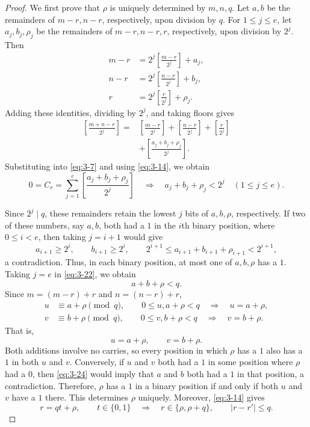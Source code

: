 \documentclass[11pt,a4paper]{article}
\numberwithin{equation}{section}
\theoremstyle{definition}
\begin{document}
\begin{proof}
We first prove that $\rho$ is uniquely determined by $m,n,q$. Let $a,b$ be the remainders of $m-r,n-r$, respectively, upon division by $q$. For $1\le j\le e$, let $a_j,b_j,\rho_j$ be the remainders of $m-r,n-r,r$, respectively, upon division by $2^j$. Then
\[
\begin{aligned}
m-r&=2^j\left[\frac{m-r}{2^j}\right]+a_j,\\
n-r&=2^j\left[\frac{n-r}{2^j}\right]+b_j,\\
r&=2^j\left[\frac r{2^j}\right]+\rho_j.
\end{aligned}
\]
Adding these identities, dividing by $2^j$, and taking floors gives
\[
\begin{aligned}
\left[\frac{m+n-r}{2^j}\right]
={}&\left[\frac{m-r}{2^j}\right]
+\left[\frac{n-r}{2^j}\right]
+\left[\frac r{2^j}\right]\\
&+\left[\frac{a_j+b_j+\rho_j}{2^j}\right].
\end{aligned}
\]
Substituting into \eqref{eq:3-7} and using \eqref{eq:3-14}, we obtain
\begin{equation}
0=C_r=\sum_{j=1}^e\left[\frac{a_j+b_j+\rho_j}{2^j}\right]
\quad\Longrightarrow\quad
a_j+b_j+\rho_j<2^j\quad(1\le j\le e).
\label{eq:3-22}
\end{equation}

Since $2^j\mid q$, these remainders retain the lowest $j$ bits of $a,b,\rho$, respectively. If two of these numbers, say $a,b$, both had a $1$ in the $i$th binary position, where $0\le i<e$, then taking $j=i+1$ would give
\[
a_{i+1}\ge2^i,\qquad b_{i+1}\ge2^i,\qquad
2^{i+1}\le a_{i+1}+b_{i+1}+\rho_{i+1}<2^{i+1},
\]
a contradiction. Thus, in each binary position, at most one of $a,b,\rho$ has a $1$. Taking $j=e$ in \eqref{eq:3-22}, we obtain
\begin{equation}
a+b+\rho<q.
\label{eq:3-23}
\end{equation}
Since $m=(m-r)+r$ and $n=(n-r)+r$,
\[
\begin{aligned}
u&\equiv a+\rho\pmod q,\qquad0\le u,a+\rho<q
\quad\Longrightarrow\quad u=a+\rho,\\
v&\equiv b+\rho\pmod q,\qquad0\le v,b+\rho<q
\quad\Longrightarrow\quad v=b+\rho.
\end{aligned}
\]
That is,
\begin{equation}
u=a+\rho,\qquad v=b+\rho.
\label{eq:3-24}
\end{equation}
Both additions involve no carries, so every position in which $\rho$ has a $1$ also has a $1$ in both $u$ and $v$. Conversely, if $u$ and $v$ both had a $1$ in some position where $\rho$ had a $0$, then \eqref{eq:3-24} would imply that $a$ and $b$ both had a $1$ in that position, a contradiction. Therefore, $\rho$ has a $1$ in a binary position if and only if both $u$ and $v$ have a $1$ there. This determines $\rho$ uniquely. Moreover, \eqref{eq:3-14} gives
\[
r=qt+\rho,\qquad t\in\{0,1\}
\quad\Longrightarrow\quad r\in\{\rho,\rho+q\},\qquad |r-r'|\le q.
\]


\end{proof}
\end{document}
